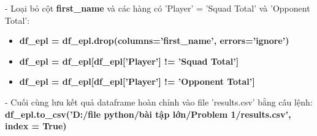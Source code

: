     - Loại bỏ cột \textbf{first\_name} và các hàng có 'Player' = 'Squad Total' và 'Opponent Total':
    \begin{itemize}
        \item \textbf{df\_epl = df\_epl.drop(columns='first\_name', errors='ignore')}
        \item \textbf{df\_epl = df\_epl[df\_epl['Player'] != 'Squad Total']}
        \item \textbf{df\_epl = df\_epl[df\_epl['Player'] != 'Opponent Total']}
    \end{itemize}
    - Cuối cùng lưu kết quả dataframe hoàn chỉnh vào file 'results.csv' bằng câu lệnh: \\ 
    \textbf{df\_epl.to\_csv('D:/file python/bài tập lớn/Problem 1/results.csv', index = True)}